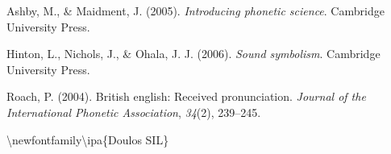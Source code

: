 \documentclass[man, fleqn, noextraspace]{apa6}
\newenvironment{Shaded}{\begin{snugshade}}{\end{snugshade}}
\newcommand{\FunctionTok}[1]{\textcolor[rgb]{0.00,0.00,0.00}{#1}}
\newcommand{\NormalTok}[1]{#1}
\begin{document}
\hypertarget{refs}{}
\hypertarget{ref-ashby2005}{}
Ashby, M., \& Maidment, J. (2005). \emph{Introducing phonetic science}.
Cambridge University Press.

\hypertarget{ref-hinton2006}{}
Hinton, L., Nichols, J., \& Ohala, J. J. (2006). \emph{Sound symbolism}.
Cambridge University Press.

\hypertarget{ref-roach2004}{}
Roach, P. (2004). British english: Received pronunciation. \emph{Journal
of the International Phonetic Association}, \emph{34}(2), 239--245.

\endgroup

\begin{Shaded}
\begin{Highlighting}[]
\FunctionTok{\textbackslash{}newfontfamily\textbackslash{}ipa}\NormalTok{\{Doulos SIL\} }
\end{Highlighting}
\end{Shaded}
\end{document}
